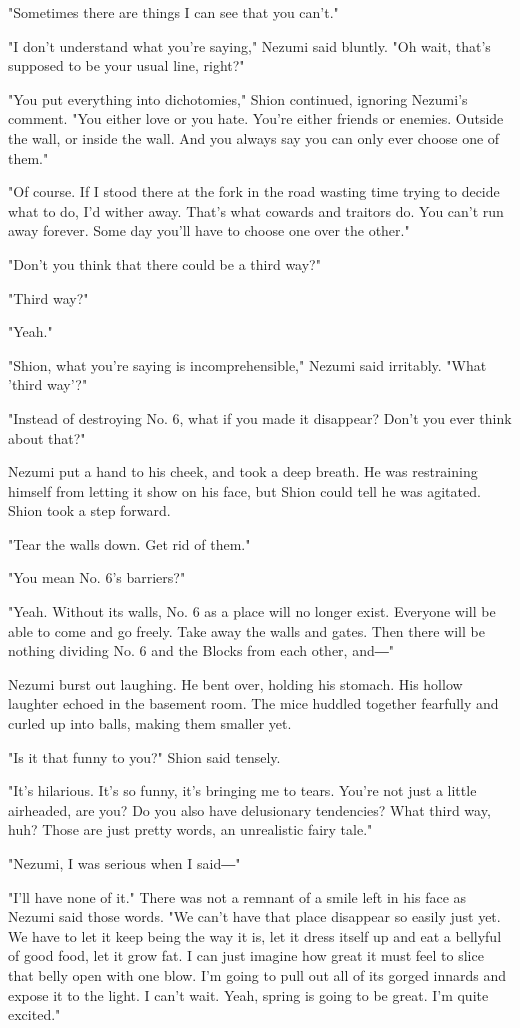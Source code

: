 "Sometimes there are things I can see that you can't."

"I don't understand what you're saying," Nezumi said bluntly. "Oh wait,
that's supposed to be your usual line, right?"

"You put everything into dichotomies," Shion continued, ignoring
Nezumi's comment. "You either love or you hate. You're either friends or
enemies. Outside the wall, or inside the wall. And you always say you
can only ever choose one of them."

"Of course. If I stood there at the fork in the road wasting time trying
to decide what to do, I'd wither away. That's what cowards and traitors
do. You can't run away forever. Some day you'll have to choose one over
the other."

"Don't you think that there could be a third way?"

"Third way?"

"Yeah."

"Shion, what you're saying is incomprehensible," Nezumi said irritably.
"What 'third way'?"

"Instead of destroying No. 6, what if you made it disappear? Don't you
ever think about that?"

Nezumi put a hand to his cheek, and took a deep breath. He was
restraining himself from letting it show on his face, but Shion could
tell he was agitated. Shion took a step forward.

"Tear the walls down. Get rid of them."

"You mean No. 6's barriers?"

"Yeah. Without its walls, No. 6 as a place will no longer exist.
Everyone will be able to come and go freely. Take away the walls and
gates. Then there will be nothing dividing No. 6 and the Blocks from
each other, and―"

Nezumi burst out laughing. He bent over, holding his stomach. His hollow
laughter echoed in the basement room. The mice huddled together
fearfully and curled up into balls, making them smaller yet.

"Is it that funny to you?" Shion said tensely.

"It's hilarious. It's so funny, it's bringing me to tears. You're not
just a little airheaded, are you? Do you also have delusionary
tendencies? What third way, huh? Those are just pretty words, an
unrealistic fairy tale."

"Nezumi, I was serious when I said―"

"I'll have none of it." There was not a remnant of a smile left in his
face as Nezumi said those words. "We can't have that place disappear so
easily just yet. We have to let it keep being the way it is, let it
dress itself up and eat a bellyful of good food, let it grow fat. I can
just imagine how great it must feel to slice that belly open with one
blow. I'm going to pull out all of its gorged innards and expose it to
the light. I can't wait. Yeah, spring is going to be great. I'm quite
excited."

